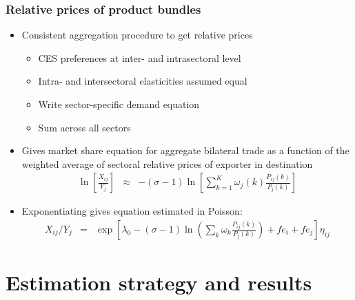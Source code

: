 \documentclass{beamer}
\begin{document}
\begin{frame}[plain]\frametitle{Relative prices of product bundles}
\begin{itemize}
\item Consistent aggregation procedure to get relative prices
\begin{itemize}
\item CES preferences at inter- and intrasectoral level
\item Intra- and intersectoral elasticities assumed equal
\item Write sector-specific demand equation 
\item Sum across all sectors 
\end{itemize}
\item Gives market share equation for aggregate bilateral trade as a function of the weighted average of sectoral relative prices of exporter in destination
\begin{eqnarray}
\ln\left[\frac{X_{ij}}{Y_j}\right]&\approx&-(\sigma-1)\ln\left[\sum_{k=1}^K{\omega_{j}(k)\frac{P_{ij}(k)}{P_j(k)}}\right] \nonumber
\end{eqnarray} 
\item Exponentiating gives equation estimated in Poisson:
\begin{eqnarray}
X_{ij}/Y_{j}&=&\exp{\left[\lambda_{0}-(\sigma-1)\ln{\left(\sum_{k}\omega_k\frac{P_{ij}(k)}{P_{j}(k)}\right)}+fe_{i}+fe_{j}\right]}\eta_{ij} \nonumber
\end{eqnarray}
\end{itemize}
\end{frame}

\section{Estimation strategy and results}
\end{document}
